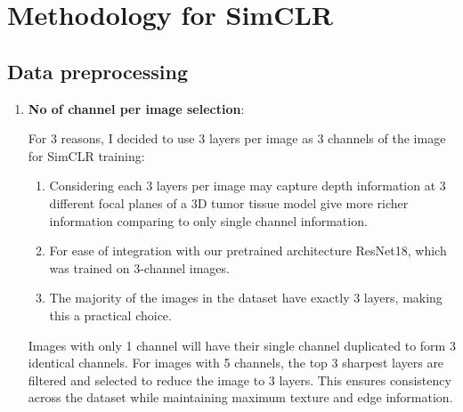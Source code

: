 \chapter{Methodology for SimCLR}\label{ch: Methodology for SimCLR}

\section{Data preprocessing} \label{sec:data preprocessing}
\begin{enumerate}
  \item \textbf{No of channel per image selection}:

   For 3 reasons, I decided to use 3 layers per image as 3 channels of the image for SimCLR training:
  \begin{enumerate}
      \item Considering each 3 layers per image may  capture depth information at 3 different focal planes of a 3D tumor tissue model give more richer information
      comparing to only single channel information.
      \item For ease of integration with our pretrained architecture ResNet18, which was trained on 3-channel images.
      \item The majority of the images in the dataset have exactly 3 layers, making this a practical choice.
  \end{enumerate}
   Images with only 1 channel will have their single channel duplicated to form 3 identical channels. For images with 5 channels, the top 3 sharpest
   layers are filtered and selected to reduce the image to 3 layers. This ensures consistency across the dataset while maintaining maximum texture and edge 
   information.


\end{enumerate}
